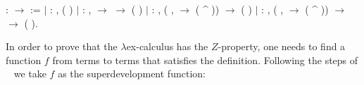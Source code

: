 \documentclass[conference]{IEEEtran}
\begin{document}
  \begin{coqdoccode}
\coqdocemptyline
\coqdocnoindent
{}  :  \ensuremath{\rightarrow}  :=\coqdoceol
\coqdocindent{1.00em}
\ensuremath{|}  : \coqdockw{\ensuremath{\forall}} ,\coqdoceol
\coqdocindent{3.00em}
 ( )\coqdoceol
\coqdocindent{1.00em}
\ensuremath{|}  : \coqdockw{\ensuremath{\forall}}  ,\coqdoceol
\coqdocindent{3.00em}
  \ensuremath{\rightarrow} \coqdoceol
\coqdocindent{3.00em}
  \ensuremath{\rightarrow} \coqdoceol
\coqdocindent{3.00em}
 (  )\coqdoceol
\coqdocindent{1.00em}
\ensuremath{|}  : \coqdockw{\ensuremath{\forall}}  ,\coqdoceol
\coqdocindent{3.00em}
(\coqdockw{\ensuremath{\forall}} ,    \ensuremath{\rightarrow}  ( \^{} )) \ensuremath{\rightarrow}\coqdoceol
\coqdocindent{3.00em}
 ( )\coqdoceol
\coqdocindent{1.00em}
\ensuremath{|}  : \coqdockw{\ensuremath{\forall}}   ,\coqdoceol
\coqdocindent{2.50em}
(\coqdockw{\ensuremath{\forall}} ,    \ensuremath{\rightarrow}  ( \^{} )) \ensuremath{\rightarrow}\coqdoceol
\coqdocindent{3.00em}
  \ensuremath{\rightarrow} \coqdoceol
\coqdocindent{3.00em}
 (  ).\coqdoceol
\end{coqdoccode}

In order to prove that the $\lambda$ex-calculus has the $Z$-property, one needs to find a function $f$ from terms to terms that satisfies the definition. Following the steps of ~\cite{kes09} we take $f$ as the superdevelopment function:
\end{document}
